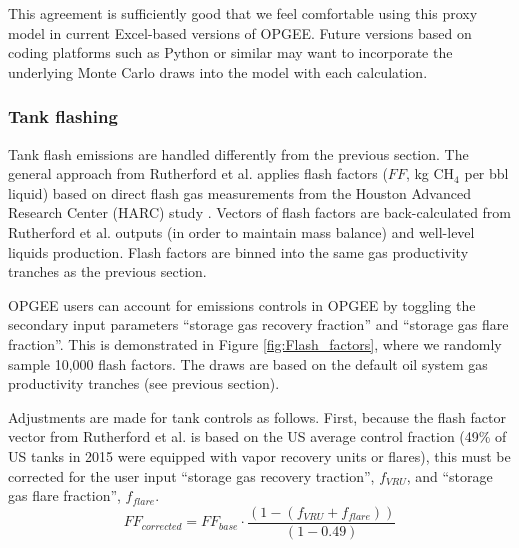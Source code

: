 \documentclass[11pt]{report}
\begin{document}
This agreement is sufficiently good that we feel comfortable using this proxy model in current Excel-based versions of OPGEE. Future versions based on coding platforms such as Python or similar may want to incorporate the underlying Monte Carlo draws into the model with each calculation.


\clearpage


\subsubsection{Tank flashing}
Tank flash emissions are handled differently from the previous section. The general approach from Rutherford et al. applies flash factors ($FF$, kg CH$_4$ per bbl liquid) based on direct flash gas measurements from the Houston Advanced Research Center (HARC) study \cite{Hendler2009}. Vectors of flash factors are back-calculated from Rutherford et al. outputs (in order to maintain mass balance) and well-level liquids production. Flash factors are binned into the same gas productivity tranches as the previous section.

OPGEE users can account for emissions controls in OPGEE by toggling the secondary input parameters ``storage gas recovery fraction'' and ``storage gas flare fraction''. This is demonstrated in Figure \ref{fig:Flash_factors}, where we randomly sample 10,000 flash factors. The draws are based on the default oil system gas productivity tranches (see previous section).

Adjustments are made for tank controls as follows. First, because the flash factor vector from Rutherford et al. is based on the US average control fraction (49\% of US tanks in 2015 were equipped with vapor recovery units or flares), this must be corrected for the user input ``storage gas recovery traction'', $f_{VRU}$, and ``storage gas flare fraction'', $f_{flare}$.
\begin{equation} 
FF_{corrected}=FF_{base}\cdot \frac{(1-(f_{VRU}+f_{flare}))}{(1-0.49)  }
\end{equation}
\end{document}
